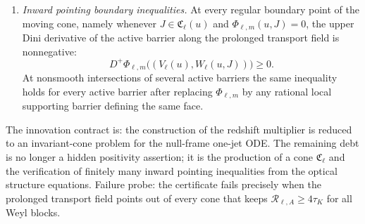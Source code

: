 \begin{definition}
\begin{enumerate}
    \item \emph{Inward pointing boundary inequalities.}  At every regular
    boundary point of the moving cone, namely whenever
    $J\in\mathfrak C_\ell(u)$ and $\Phi_{\ell,m}(u,J)=0$, the upper Dini
    derivative of the active barrier along the prolonged transport field is
    nonnegative:
    \[
        D^+
        \Phi_{\ell,m}
        \bigl((V_\ell(u),W_\ell(u,J))\bigr)
        \ge0 .
    \]
    At nonsmooth intersections of several active barriers the same inequality
    holds for every active barrier after replacing $\Phi_{\ell,m}$ by any
    rational local supporting barrier defining the same face.
\end{enumerate}
The innovation contract is: the construction of the redshift multiplier is
reduced to an invariant-cone problem for the null-frame one-jet ODE.  The
remaining debt is no longer a hidden positivity assertion; it is the production
of a cone $\mathfrak C_\ell$ and the verification of finitely many inward
pointing inequalities from the optical structure equations.  Failure probe:
the certificate fails precisely when the prolonged transport field points out
of every cone that keeps
$\mathcal R_{\ell,A}\ge4\tau_K$ for all Weyl blocks.
\end{definition}

